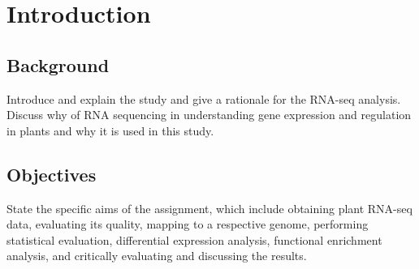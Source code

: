 \section{Introduction}

\subsection{Background}
Introduce and explain the study and give a rationale for the RNA-seq analysis. Discuss why of RNA sequencing in understanding gene expression and regulation in plants and why it is used in this study.

\subsection{Objectives}
State the specific aims of the assignment, which include obtaining plant RNA-seq data, evaluating its quality, mapping to a respective genome, performing statistical evaluation, differential expression analysis, functional enrichment analysis, and critically evaluating and discussing the results.
